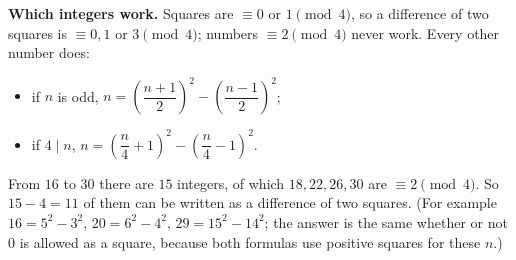 \textbf{Which integers work.} Squares are $\equiv0$ or $1\pmod4$, so a difference of two squares is $\equiv0,1$ or $3\pmod4$; numbers $\equiv2\pmod4$ never work. Every other number does:
\begin{itemize}
\item if $n$ is odd, $n=\left(\dfrac{n+1}{2}\right)^2-\left(\dfrac{n-1}{2}\right)^2$;
\item if $4\mid n$, $n=\left(\dfrac {n}{4}+1\right)^2-\left(\dfrac {n}{4}-1\right)^2$.
\end{itemize}
From $16$ to $30$ there are $15$ integers, of which $18,22,26,30$ are $\equiv2\pmod4$. So $15-4=\boxed{11}$ of them can be written as a difference of two squares. (For example $16=5^2-3^2$, $20=6^2-4^2$, $29=15^2-14^2$; the answer is the same whether or not $0$ is allowed as a square, because both formulas use positive squares for these $n$.)
